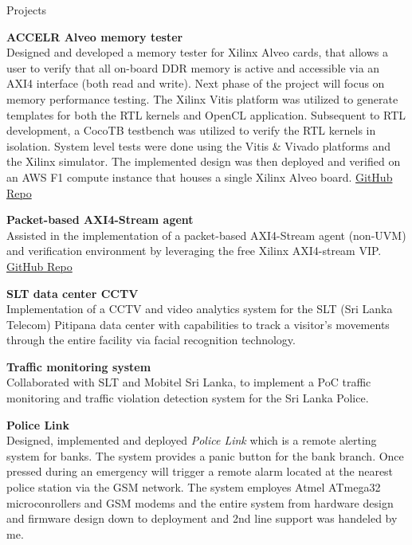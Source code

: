 \documentclass[
	11pt, %
]{./assets/resume} %
\begin{document}
\begin{rSection}{Projects}

	\textbf{ACCELR Alveo memory tester} \\
	Designed and developed a memory tester for Xilinx Alveo cards, that allows a user to verify that all on-board DDR memory is active and accessible via an AXI4 interface (both read and write). Next phase of the project will focus on memory performance testing. The Xilinx Vitis platform was utilized to generate templates for both the RTL kernels and OpenCL application. Subsequent to RTL development, a CocoTB testbench was utilized to verify the RTL kernels in isolation. System level tests were done using the Vitis \& Vivado platforms and the Xilinx simulator. The implemented design was then deployed and verified on an AWS F1 compute instance that houses a single Xilinx Alveo board. \href{https://github.com/accelr-net/alveo-memory-tester}{GitHub Repo}

	\textbf{Packet-based AXI4-Stream agent} \\
	Assisted in the implementation of a packet-based AXI4-Stream agent (non-UVM) and verification environment by leveraging the free Xilinx AXI4-stream VIP. \href{https://github.com/accelr-net/axis_fifo_unit_test}{GitHub Repo}

	\textbf{SLT data center CCTV} \\
	Implementation of a CCTV and video analytics system for the SLT (Sri Lanka Telecom) Pitipana data center with capabilities to track a visitor's movements through the entire facility via facial recognition technology.

	\textbf{Traffic monitoring system} \\
	Collaborated with SLT and Mobitel Sri Lanka, to implement a PoC traffic monitoring and traffic violation detection system for the Sri Lanka Police.

	\textbf{Police Link} \\
	Designed, implemented and deployed \emph{Police Link} which is a remote alerting system for banks. The system provides a panic button for the bank branch. Once pressed during an emergency will trigger a remote alarm located at the nearest police station via the GSM network. The system employes Atmel ATmega32 microconrollers and GSM modems and the entire system from hardware design and firmware design down to deployment and 2nd line support was handeled by me.

\end{rSection}
\end{document}
